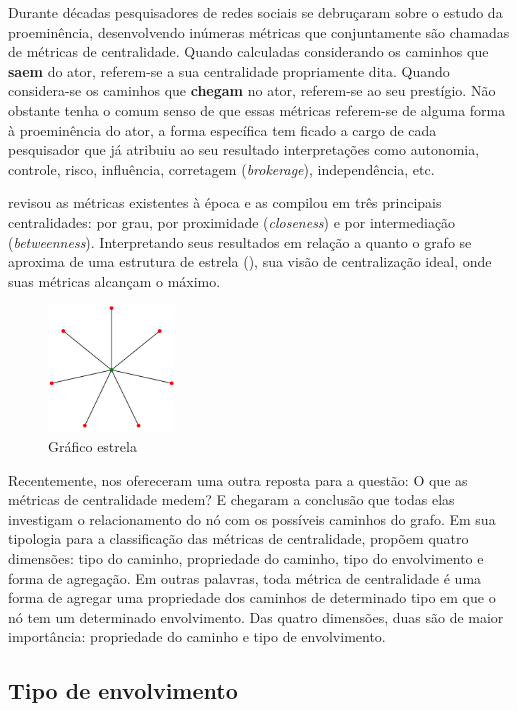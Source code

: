 Durante décadas pesquisadores de redes sociais se debruçaram sobre o estudo da
proeminência, desenvolvendo inúmeras métricas que conjuntamente são chamadas de
métricas de centralidade. Quando calculadas considerando os caminhos que
\textbf{saem} do ator, referem-se a sua centralidade propriamente dita. Quando
considera-se os caminhos que \textbf{chegam} no ator, referem-se ao seu
prestígio. Não obstante tenha o comum senso de que essas métricas referem-se de
alguma forma à proeminência do ator, a forma específica tem ficado a cargo de
cada pesquisador que já atribuiu ao seu resultado interpretações como autonomia,
controle, risco, influência, corretagem (\emph{brokerage}), independência,
etc.

\citet{Freeman1979} revisou as métricas existentes à época e as compilou em três
principais centralidades: por grau, por proximidade (\emph{closeness}) e por
intermediação (\emph{betweenness}). Interpretando seus resultados em relação a
quanto o grafo se aproxima de uma estrutura de estrela (),
sua visão de centralização ideal, onde suas métricas alcançam o máximo.

\begin{figure}[h!]
  \centering
    \includegraphics[width=0.3\textwidth]{imgs/star.png}
    \caption{Gráfico estrela}
  	\label{fig:star}
\end{figure}

Recentemente, \citet{Borgatti2006} nos ofereceram uma outra reposta para a
questão: O que as métricas de centralidade medem? E chegaram a conclusão que
todas elas investigam o relacionamento do nó com os possíveis caminhos do grafo.
Em sua tipologia para a classificação das métricas de centralidade, propõem
quatro dimensões: tipo do caminho, propriedade do caminho, tipo do envolvimento e
forma de agregação. Em outras palavras, toda métrica de centralidade é uma forma
de agregar uma propriedade dos caminhos de determinado tipo em que o nó tem um
determinado envolvimento. Das quatro dimensões, duas são de maior importância:
propriedade do caminho e tipo de envolvimento.

\subsection{Tipo de envolvimento} 

